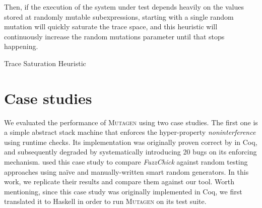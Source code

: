 \documentclass[sigconf, anonymous, review]{acmart}
\newcommand{\fuzzchick}{\textit{FuzzChick}\xspace}
\newcommand{\mutagen}{\textsc{Mutagen}\xspace}
\begin{document}
Then, if the execution of the system under test depends heavily on the values
stored at randomly mutable subexpressions, starting with a single random
mutation will quickly saturate the trace space, and this heuristic will
continuously increase the random mutations parameter until that stops happening.

\begin{algorithm}[t]
  \SetAlgoLined
  \DontPrintSemicolon

\caption{\label{algo:mutagen:reset}Trace Saturation Heuristic}
\end{algorithm}






\section{Case studies}
\label{sec:casestudies}

We evaluated the performance of \mutagen using two case studies.
%
The first one is a simple abstract stack machine that enforces the
hyper-property \emph{noninterference} \cite{goguen1982security} using runtime
checks.
%
Its implementation was originally proven correct by
\citeauthor{10.1145/2578855.2535839} \citeyearpar{10.1145/2578855.2535839} in
Coq, and subsequently degraded by systematically introducing 20 bugs on its
enforcing mechanism.
%
\citeauthor{lampropoulos2019coverage} used this case study to compare \fuzzchick
against random testing approaches using na\"ive and manually-written smart
random generators.
%
In this work, we replicate their results and compare them against our tool.
%
Worth mentioning, since this case study was originally implemented in Coq, we
first translated it to Haskell in order to run \mutagen on its test suite.
\end{document}
